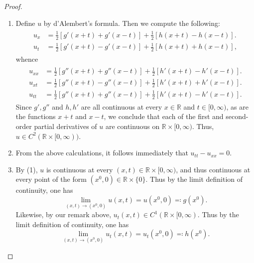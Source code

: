 \documentclass{article}
\numberwithin{equation}{section}
\begin{document}
	\begin{proof}
		$ $\newline \vspace{-0.65cm}
		\begin{enumerate}[itemsep =-2pt,label = (\roman{*})]
			\item Define $u$ by d'Alembert's formula. Then we compute the following: 
			\begin{align*}
				\begin{split}
					u_{x} &= \frac{1}{2}[g'(x + t) + g'(x - t)] + \frac{1}{2}[h(x + t) - h(x - t)]. \\
					u_{t} &= \frac{1}{2}[g'(x + t) -g'(x - t)] + \frac{1}{2}[h(x + t) + h(x - t)], 
				\end{split}
			\end{align*}
			whence 
			\begin{align*}
				\begin{split}
					u_{xx} &= \frac{1}{2}[g''(x + t) + g''(x - t)] + \frac{1}{2}[h'(x + t) - h'(x - t)]. \\ 
					u_{xt} &= \frac{1}{2}[g''(x + t) - g''(x - t)] + \frac{1}{2}[h'(x + t) + h'(x - t)].  \\
					u_{tt} &= \frac{1}{2}[g''(x + t) +  g''(x - t)] + \frac{1}{2}[h'(x + t) - h'(x - t)]. 
				\end{split}
			\end{align*}
			Since $g', g''$ and $h, h'$ are all continuous at every $x \in \mathbb{R}$ and $t \in [0, \infty)$, as are the functions $x + t$ and $x - t$, we conclude that each of the first and second-order partial derivatives of $u$ are continuous on $\mathbb{R} \times [0, \infty)$. Thus, $u \in C^{2}(\mathbb{R} \times [0,\infty))$. 
			\item From the above calculations, it follows immediately that $u_{tt} - u_{xx} = 0$. 
			\item By (1), $u$ is continuous at every $(x, t) \in \mathbb{R} \times [0, \infty)$, and thus continuous at every point of the form $(x^{0}, 0) \in \mathbb{R} \times \{0\}$. Thus by the limit definition of continuity, one has 
			\begin{equation*}
				\lim_{(x, t) \to (x^{0}, 0)}u(x, t) = u(x^{0}, 0) \eqqcolon g(x^{0}). 
			\end{equation*}
			Likewise, by our remark above, $u_{t}(x, t) \in C^{1}(\mathbb{R} \times [0, \infty)$. Thus by the limit definition of continuity, one has 
			\begin{equation*}
				\lim_{(x, t) \to (x^{0}, 0)} u_{t}(x, t) = u_{t}(x^{0}, 0) \eqqcolon h(x^{0}). 
			\end{equation*}
		\end{enumerate}
	\end{proof}
	
\end{document}
